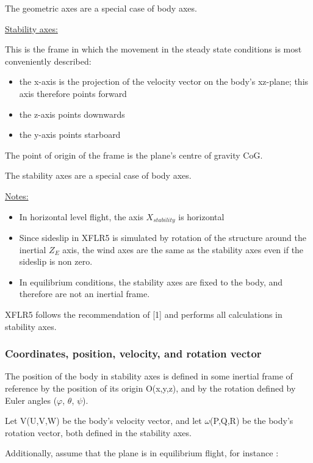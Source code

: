 \documentclass[a4paper,twoside,12pt,dvips]{article}
\begin{document}
The geometric axes are a special case of body axes.

\underline{Stability axes:}

This is the frame in which the movement in the steady state conditions
is most conveniently described:

\begin{itemize}
\item the x-axis is the projection of the velocity vector on
the body's xz-plane; this axis therefore points
forward
\item the z-axis points downwards
\item the y-axis points starboard
\end{itemize}

The point of origin of the frame is the plane's centre
of gravity CoG.

The stability axes are a special case of body axes.

\underline{Notes:}

\begin{itemize}
\item In horizontal level flight, the axis
$X_{stability}$ is horizontal
\item Since sideslip in XFLR5 is simulated by rotation of the
structure around the inertial $Z_E$ axis, the wind axes
are the same as the stability axes even if the sideslip is non zero.
\item In equilibrium conditions, the stability axes are fixed
to the body, and therefore are not an inertial frame.
\end{itemize}

XFLR5 follows the recommendation of [1] and performs all calculations in
stability axes.

\subsubsection{Coordinates, position, velocity, and rotation vector}

The position of the body in stability axes is defined in some inertial
frame of reference by the position of its origin O(x,y,z), and by the
rotation defined by Euler angles (\textrm{${\varphi}$, ${\theta}$,
${\psi}$}).

Let V(U,V,W) be the body's velocity vector, and let
\textrm{${\omega}$}(P,Q,R) be the body's rotation
vector, both defined in the stability axes.

Additionally, assume that the plane is in equilibrium flight, for
instance :
\end{document}
